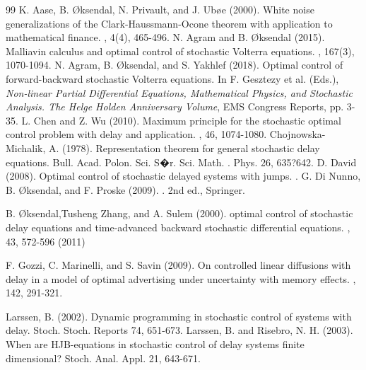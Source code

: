 \documentclass[12pt]{article}
\theoremstyle{remark}
\numberwithin{equation}{section}
\begin{document}
\begin{thebibliography}{99}
	K. Aase, B. {\O}ksendal, N. Privault, and J. Ub{\o}e (2000).
\newblock White noise generalizations of the Clark-Haussmann-Ocone theorem with application to mathematical finance.
, 4(4), 465-496.
N. Agram and B. {\O}ksendal (2015). \newblock Malliavin calculus and optimal control of stochastic Volterra equations.
, 167(3), 1070-1094.
 N. Agram, B. {\O}ksendal, and S. Yakhlef (2018).
\newblock Optimal control of forward-backward stochastic Volterra equations.
\newblock In F. Gesztezy et al. (Eds.), {\em Non-linear Partial Differential Equations, Mathematical Physics, and Stochastic Analysis. The Helge Holden Anniversary Volume}, EMS Congress Reports, pp. 3-35.
L. Chen and Z. Wu (2010). \newblock Maximum principle for the stochastic optimal control problem with delay and application. , 46, 1074-1080.
 Chojnowska-Michalik, A. (1978). \newblock Representation theorem for general stochastic delay equations. Bull. Acad. Polon. Sci. S�r. Sci. Math.  . Phys. 26, 635?642.
 D. David (2008). \newblock Optimal control of stochastic delayed systems with jumps. .
 G. Di Nunno, B. {\O}ksendal, and F. Proske (2009). . \newblock 2nd ed., Springer.

 B. {\O}ksendal,Tusheng Zhang, and A. Sulem (2000).
\newblock optimal control of stochastic delay equations and time-advanced backward stochastic differential equations. , 43, 572-596 (2011)

 F. Gozzi, C. Marinelli, and S. Savin (2009).
\newblock On controlled linear diffusions with delay in a model of optimal advertising under uncertainty with memory effects. , 142, 291-321.

Larssen, B. (2002).
\newblock Dynamic programming in stochastic control of systems with delay. Stoch. Stoch. Reports
74, 651-673.
Larssen, B. and Risebro, N. H. (2003). When are HJB-equations in stochastic control of delay systems finite
dimensional? Stoch. Anal. Appl. 21, 643-671.


\end{thebibliography}
\end{document}
